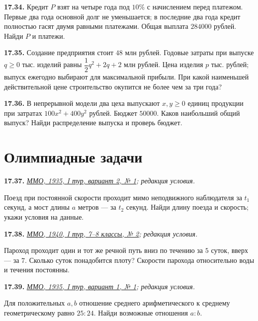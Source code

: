\ifdim\dimexpr\ht\CatFlowBox+\dp\CatFlowBox\relax<58mm\dp\CatFlowBox=\dimexpr58mm-\ht\CatFlowBox\relax\fi%
\noindent\usebox{\CatFlowBox}\par\addvspace{2pt}

\noindent\begin{minipage}[t]{\linewidth}\textbf{17.34.}\starmark{} Кредит \(P\) взят на четыре года под \(10\%\) с начислением перед платежом. Первые два года основной долг не уменьшается; в последние два года кредит полностью гасят двумя равными платежами. Общая выплата \(284000\) рублей. Найди \(P\) и платежи.\par\end{minipage}\par
\noindent\begin{minipage}[t]{\linewidth}\textbf{17.35.}\starmark{} Создание предприятия стоит \(48\) млн рублей. Годовые затраты при выпуске \(q\ge0\) тыс. изделий равны \(\dfrac12q^2+2q+2\) млн рублей. Цена изделия \(p\) тыс. рублей; выпуск ежегодно выбирают для максимальной прибыли. При какой наименьшей действительной цене строительство окупится не более чем за три года?\par\end{minipage}\par
\noindent\begin{minipage}[t]{\linewidth}\textbf{17.36.}\starmark{} В непрерывной модели два цеха выпускают \(x,y\ge0\) единиц продукции при затратах \(100x^2+400y^2\) рублей. Бюджет \(50000\). Каков наибольший общий выпуск? Найди распределение выпуска и проверь бюджет.\par\end{minipage}\par
\par{}\section*{Олимпиадные задачи}
\noindent\begin{minipage}[t]{\linewidth}\textbf{17.37.} {\small\itshape\href{https://mmo.mccme.ru/books/mmo-35-57.pdf}{ММО, 1935, I тур, вариант 2, № 1}; редакция условия.}\par Поезд при постоянной скорости проходит мимо неподвижного наблюдателя за \(t_1\) секунд, а мост длины \(a\) метров — за \(t_2\) секунд. Найди длину поезда и скорость; укажи условия на данные.\par
\textbf{17.38.} {\small\itshape\href{https://mmo.mccme.ru/books/mmo-35-57.pdf}{ММО, 1940, I тур, 7–8 классы, № 2}; редакция условия.}\par Пароход проходит один и тот же речной путь вниз по течению за \(5\) суток, вверх — за \(7\). Сколько суток понадобится плоту? Скорости парохода относительно воды и течения постоянны.\par
\textbf{17.39.}\starmark{} {\small\itshape\href{https://mmo.mccme.ru/books/mmo-35-57.pdf}{ММО, 1935, I тур, вариант 1, № 1}; редакция условия.}\par Для положительных \(a,b\) отношение среднего арифметического к среднему геометрическому равно \(25:24\). Найди возможные отношения \(a:b\).\par\end{minipage}\par
\endgroup
